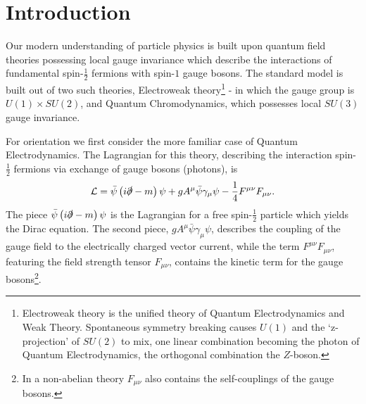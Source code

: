 \chapter{Introduction} \label{chap::intro}



Our modern understanding of particle physics is built upon quantum field theories possessing local gauge invariance which describe the interactions of fundamental spin-$\frac{1}{2}$ fermions with spin-$1$ gauge bosons. The standard model is built out of two such theories, Electroweak theory\footnote{Electroweak theory is the unified theory of Quantum Electrodynamics and Weak Theory. Spontaneous symmetry breaking causes $U(1)$ and the `z-projection' of $SU(2)$ to mix, one linear combination becoming the photon of Quantum Electrodynamics, the orthogonal combination the $Z$-boson.} - in which the gauge group is $U(1)\times SU(2)$, and Quantum Chromodynamics, which possesses local $SU(3)$ gauge invariance. 

For orientation we first consider the more familiar case of Quantum Electrodynamics. The Lagrangian for this theory, describing the interaction spin-$\frac{1}{2}$ fermions via exchange of gauge bosons (photons), is 
\begin{equation*}
\mathcal{L} = \bar{\psi} \left( i\slashed{\partial} - m \right) \psi +gA^\mu \bar{\psi} \gamma_\mu \psi - \frac{1}{4} F^{\mu\nu } F_{\mu\nu}.
\end{equation*}
The piece $\bar{\psi} \left( i\slashed{\partial} - m \right) \psi$ is the Lagrangian for a free spin-$\frac{1}{2}$ particle which yields the Dirac equation. The second piece, $gA^\mu \bar{\psi} \gamma_\mu \psi$, describes the coupling of the gauge field to the electrically charged vector current, while the term $F^{\mu\nu}F_{\mu\nu}$, featuring the field strength tensor $F_{\mu\nu}$, contains the kinetic term for the gauge bosons\footnote{In a  non-abelian theory $F_{\mu\nu}$ also contains the self-couplings of the gauge bosons.}.

